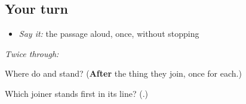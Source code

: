 \subsection*{Your turn}
\begin{itemize}
\raggedright
  \item \emph{Say it:} the passage aloud, once, without stopping
\end{itemize}

\emph{Twice through:}

\begin{tcolorbox}[breakable,colback=teal!4,colframe=teal!35!black,title={Before you move on}]
Where do \textbf{} and \textbf{} stand? (\textbf{After} the thing they join, once for each.)

Which joiner stands first in its line? (\textbf{}.)
\end{tcolorbox}
